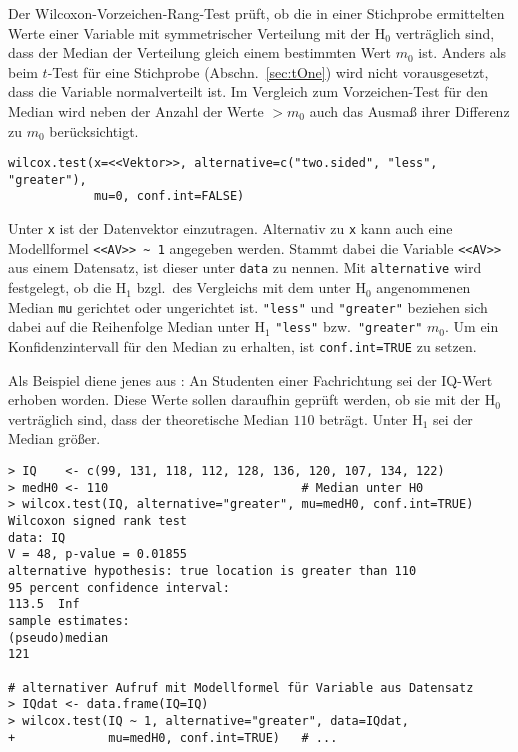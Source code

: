 Der Wilcoxon-Vorzeichen-Rang-Test prüft, ob die in einer Stichprobe ermittelten Werte einer Variable mit symmetrischer Verteilung mit der $\text{H}_{0}$ verträglich sind, dass der Median der Verteilung gleich einem bestimmten Wert $m_{0}$ ist. Anders als beim $t$-Test für eine Stichprobe (Abschn.\ \ref{sec:tOne}) wird nicht vorausgesetzt, dass die Variable normalverteilt ist. Im Vergleich zum Vorzeichen-Test für den Median wird neben der Anzahl der Werte $> m_{0}$ auch das Ausmaß ihrer Differenz zu $m_{0}$ berücksichtigt.
\begin{lstlisting}
wilcox.test(x=<<Vektor>>, alternative=c("two.sided", "less", "greater"),
            mu=0, conf.int=FALSE)
\end{lstlisting}

Unter \lstinline!x! ist der Datenvektor einzutragen. Alternativ zu \lstinline!x! kann auch eine Modellformel \lstinline!<<AV>> ~ 1! angegeben werden. Stammt dabei die Variable \lstinline!<<AV>>! aus einem Datensatz, ist dieser unter \lstinline!data! zu nennen. Mit \lstinline!alternative! wird festgelegt, ob die $\text{H}_{1}$ bzgl.\ des Vergleichs mit dem unter $\text{H}_{0}$ angenommenen Median \lstinline!mu! gerichtet oder ungerichtet ist. \lstinline!"less"! und \lstinline!"greater"! beziehen sich dabei auf die Reihenfolge Median unter $\text{H}_{1}$ \lstinline!"less"! bzw.\ \lstinline!"greater"! $m_{0}$. Um ein Konfidenzintervall für den Median zu erhalten, ist \lstinline!conf.int=TRUE! zu setzen.

Als Beispiel diene jenes aus : An Studenten einer Fachrichtung sei der IQ-Wert erhoben worden. Diese Werte sollen daraufhin geprüft werden, ob sie mit der $\text{H}_{0}$ verträglich sind, dass der theoretische Median $110$ beträgt. Unter $\text{H}_{1}$ sei der Median größer.
\begin{lstlisting}
> IQ    <- c(99, 131, 118, 112, 128, 136, 120, 107, 134, 122)
> medH0 <- 110                           # Median unter H0
> wilcox.test(IQ, alternative="greater", mu=medH0, conf.int=TRUE)
Wilcoxon signed rank test
data: IQ
V = 48, p-value = 0.01855
alternative hypothesis: true location is greater than 110
95 percent confidence interval:
113.5  Inf
sample estimates:
(pseudo)median
121

# alternativer Aufruf mit Modellformel für Variable aus Datensatz
> IQdat <- data.frame(IQ=IQ)
> wilcox.test(IQ ~ 1, alternative="greater", data=IQdat,
+             mu=medH0, conf.int=TRUE)   # ...
\end{lstlisting}


